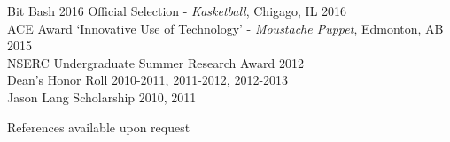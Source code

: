 \documentclass[10pt]{article}
\begin{document}
\noindent Bit Bash 2016 Official Selection - \emph{Kasketball}, Chigago, IL \hfill 2016 \\

\noindent ACE Award ‘Innovative Use of Technology’ - \emph{Moustache Puppet}, Edmonton, AB \hfill 2015 \\

\noindent NSERC Undergraduate Summer Research Award \hfill 2012 \\

\noindent Dean's Honor Roll \hfill 2010-2011, 2011-2012, 2012-2013 \\

\noindent Jason Lang Scholarship \hfill 2010, 2011 \\

\vspace{\baselineskip}

\noindent References available upon request
\end{document}
